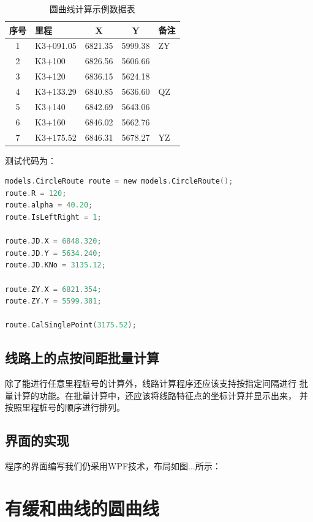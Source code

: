 \begin{table}[htbp]
    \centering
    \caption{圆曲线计算示例数据表}
    \label{tab:YRoute}
    \begin{tabular}{clccl}
        \hline
        序号 & 里程        & X       & Y       & 备注 \\
        \hline
        1  & K3+091.05 & 6821.35 & 5999.38 & ZY \\
        2  & K3+100    & 6826.56 & 5606.66 &    \\
        3  & K3+120    & 6836.15 & 5624.18 &    \\
        4  & K3+133.29 & 6840.85 & 5636.60 & QZ \\
        5  & K3+140    & 6842.69 & 5643.06 &    \\
        6  & K3+160    & 6846.02 & 5662.76 &    \\
        7  & K3+175.52 & 6846.31 & 5678.27 & YZ \\
        \hline
    \end{tabular}
\end{table}

测试代码为：
\begin{lstlisting}[language=C]
models.CircleRoute route = new models.CircleRoute();
route.R = 120;
route.alpha = 40.20;
route.IsLeftRight = 1;

route.JD.X = 6848.320;
route.JD.Y = 5634.240;
route.JD.KNo = 3135.12;

route.ZY.X = 6821.354;
route.ZY.Y = 5599.381;

route.CalSinglePoint(3175.52);
\end{lstlisting}

\subsection{线路上的点按间距批量计算}

除了能进行任意里程桩号的计算外，线路计算程序还应该支持按指定间隔进行
批量计算的功能。在批量计算中，还应该将线路特征点的坐标计算并显示出来，
并按照里程桩号的顺序进行排列。


\subsection{界面的实现}

程序的界面编写我们仍采用WPF技术，布局如图...所示：


\section{有缓和曲线的圆曲线}

